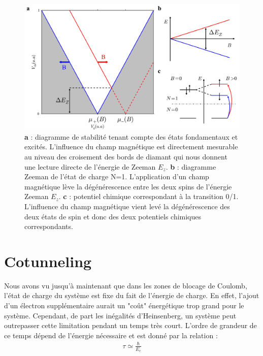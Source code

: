 \begin{figure}
\includegraphics[scale=0.45]{Annexe2/figure4/figure4.pdf} 
\caption{ \textbf{a} : diagramme de stabilité tenant compte des états fondamentaux et excités. L'influence du champ magnétique est directement mesurable au niveau des croisement des bords de diamant qui nous donnent une lecture directe de l'énergie de Zeeman $E_z$. \textbf{b} : diagramme Zeeman de l'état de charge N=1. L'application d'un champ magnétique lève la dégénérescence entre les deux spins de l'énergie Zeeman $E_z$. \textbf{c} : potentiel chimique correspondant à la transition 0/1. L'influence du champ magnétique vient levé la dégénérescence des deux états de spin et donc des deux potentiels chimiques correspondants.}
\label{etat_excite}
\end{figure}

\section{Cotunneling}
Nous avons vu jusqu'à maintenant que dans les zones de blocage de Coulomb, l'état de charge du système est fixe du fait de l'énergie de charge. En effet, l'ajout d'un électron supplémentaire aurait un "co\^ut" énergétique trop grand pour le système. Cependant, de part les inégalités d'Heinsenberg, un système peut outrepasser cette limitation pendant un temps très court. L'ordre de grandeur de ce temps dépend de l'énergie nécessaire et est donné par la relation :
\begin{eqnarray}
\tau \simeq \frac{\hbar}{E_c} \nonumber
\end{eqnarray}



